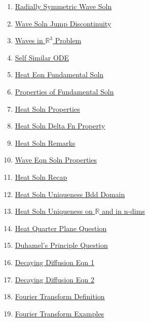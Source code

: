 \documentclass[11pt]{article}
\begin{document}
\begin{multicols}{2}
\begin{enumerate}
		\item  \href{https://mp.weixin.qq.com/s/lBIN7kFJGZMyPb3m2xfDcQ}{Radially Symmetric Wave Soln} %
		\item  \href{https://mp.weixin.qq.com/s/opj8--VNgQ2FGlsljErqBw}{Wave Soln Jump Discontinuity} %
		\item  \href{https://mp.weixin.qq.com/s/ZQr8AfPJUDRkdm-CfmgYtg}{Waves in $\mathbb{R}^{3}$ Problem} %
		\item  \href{https://mp.weixin.qq.com/s/hzfDtxUiLNgyWqiGhLRRUA}{Self Similar ODE} %
		\item  \href{https://mp.weixin.qq.com/s/-lhlXIjpCL_CNBCJL82bsA}{Heat Eqn Fundamental Soln} %
		\item  \href{https://mp.weixin.qq.com/s/FI-pdo2LLeCOZJUScQX0mg}{Properties of Fundamental Soln} %
		\item  \href{https://mp.weixin.qq.com/s/Ed5IEwOitm8e1QltBmgjBA}{Heat Soln Properties} %
		\item  \href{https://mp.weixin.qq.com/s/1U9O2EHy_b66RcXxocIDGA}{Heat Soln Delta Fn Property} %
		\item  \href{https://mp.weixin.qq.com/s/Npv9F-YDqQgnNib65jICPw}{Heat Soln Remarks} %
		\item  \href{https://mp.weixin.qq.com/s/Q_RcxhBKJO9yVmO3usKh5w}{Wave Eqn Soln Properties} %
		\item  \href{https://mp.weixin.qq.com/s/fpG_vnT7BhKSM2VQeFguBA}{Heat Soln Recap} %
		\item  \href{https://mp.weixin.qq.com/s/Ih_fZbGKkKPEdeSFWKdJxg}{Heat Soln Uniqueness Bdd Domain} %
		\item  \href{https://mp.weixin.qq.com/s/BgRY7Mti3siSRyThNQYzqA}{Heat Soln Uniqueness on $\mathbb{R}$ and in n-dims} %
		\item  \href{https://mp.weixin.qq.com/s/8ea163Ttd5UbyDtCTG6P0w}{Heat Quarter Plane Question} %
		\item  \href{https://mp.weixin.qq.com/s/_oucBNJyIc9CxQWDkdmlaA}{Duhamel's Principle Question} %
		\item  \href{https://mp.weixin.qq.com/s/L9fYp4uvYKoly0PnAnp4Nw}{Decaying Diffusion Eqn 1} %
		\item  \href{https://mp.weixin.qq.com/s/xyfzkRIO7lna8VtJChiq0A}{Decaying Diffusion Eqn 2} %
		\item  \href{https://mp.weixin.qq.com/s/H2YGz0kgdmM4b9VJduiEbA}{Fourier Transform Definition} %
		\item  \href{https://mp.weixin.qq.com/s/IHTsH7ns2zF6G6vgqzmiTw}{Fourier Transform Examples} %

\end{enumerate}
\end{multicols}
\end{document}
